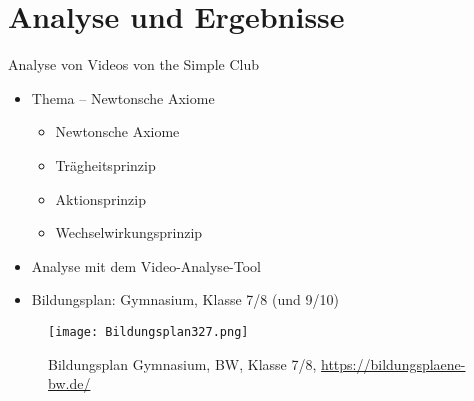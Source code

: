 \documentclass[
	aspectratio=169, %
	8pt, %
]{beamer}
\begin{document}
\section{Analyse und Ergebnisse}
\begin{frame}{\insertsection}
Analyse von Videos von the Simple Club
\begin{itemize}
	\item Thema -- Newtonsche Axiome
	\begin{itemize}
		\item Newtonsche Axiome
		\item Trägheitsprinzip
		\item Aktionsprinzip
		\item Wechselwirkungsprinzip
	\end{itemize}
	\item Analyse mit dem Video-Analyse-Tool
	\item Bildungsplan: Gymnasium, Klasse 7/8 (und 9/10)
\end{itemize}

\begin{figure}
	\centering
	\texttt{[image: Bildungsplan327.png]}
	\caption{Bildungsplan Gymnasium, BW, Klasse 7/8, \href{https://bildungsplaene-bw.de/\%2CLde/LS/BP2016BW/ALLG/GYM/PH.V2/IK/7-8/07}{https://bildungsplaene-bw.de/}}
	
\end{figure}


\end{frame}
\end{document}
